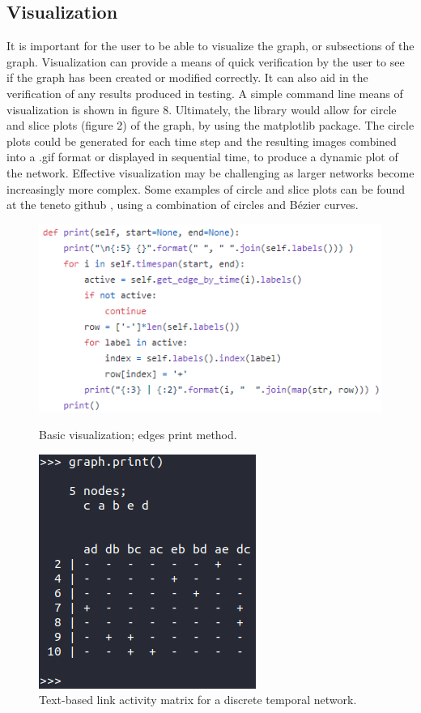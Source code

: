 \begin{design}
\subsection{Visualization}
It is important for the user to be able to visualize the graph, or subsections of the graph. Visualization can provide a means of quick verification by the user to see if the graph has been created or modified correctly. It can also aid in the verification of any results produced in testing. A simple command line means of visualization is shown in figure 8. Ultimately, the library would allow for circle \cite{circle_plot} and slice plots (figure 2) of the graph, by using the matplotlib package. The circle plots could be generated for each time step and the resulting images combined into a .gif format or displayed in sequential time, to produce a dynamic plot of the network. Effective visualization may be challenging as larger networks become increasingly more complex. Some examples of circle and slice plots can be found at the teneto github \cite{teneto}, using a combination of circles and Bézier curves.
\begin{figure}[t]
  \centering
  \begin{minipage}[b]{0.4\textwidth}
    \centering
    \includegraphics[scale=0.7]{images/graph_print_code.PNG}
    \caption{Basic visualization; edges print method.}
  \end{minipage}
  \hfill
  \begin{minipage}[b]{0.4\textwidth}
    \centering
    \includegraphics[scale=0.58]{images/graph_print.PNG}
    \caption{Text-based link activity matrix for a discrete temporal network.}
  \end{minipage}
\end{figure}

\end{design}
